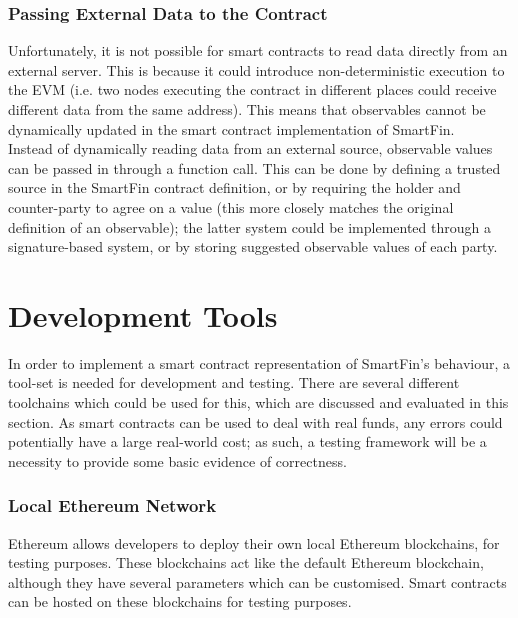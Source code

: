 \subsubsection{Passing External Data to the Contract}

Unfortunately, it is not possible for smart contracts to read data directly from an external server. This is because it could introduce non-deterministic execution to the EVM (i.e. two nodes executing the contract in different places could receive different data from the same address). This means that observables cannot be dynamically updated in the smart contract implementation of SmartFin. \\

Instead of dynamically reading data from an external source, observable values can be passed in through a function call. This can be done by defining a trusted source in the SmartFin contract definition, or by requiring the holder and counter-party to agree on a value (this more closely matches the original definition of an observable\cite{SPJ}); the latter system could be implemented through a signature-based system, or by storing suggested observable values of each party.


\section{Development Tools} \label{dev-tools}

In order to implement a smart contract representation of SmartFin's behaviour, a tool-set is needed for development and testing. There are several different toolchains which could be used for this, which are discussed and evaluated in this section. As smart contracts can be used to deal with real funds, any errors could potentially have a large real-world cost; as such, a testing framework will be a necessity to provide some basic evidence of correctness.


\subsubsection{Local Ethereum Network}

Ethereum allows developers to deploy their own local Ethereum blockchains, for testing purposes. These blockchains act like the default Ethereum blockchain, although they have several parameters which can be customised. Smart contracts can be hosted on these blockchains for testing purposes. \\

